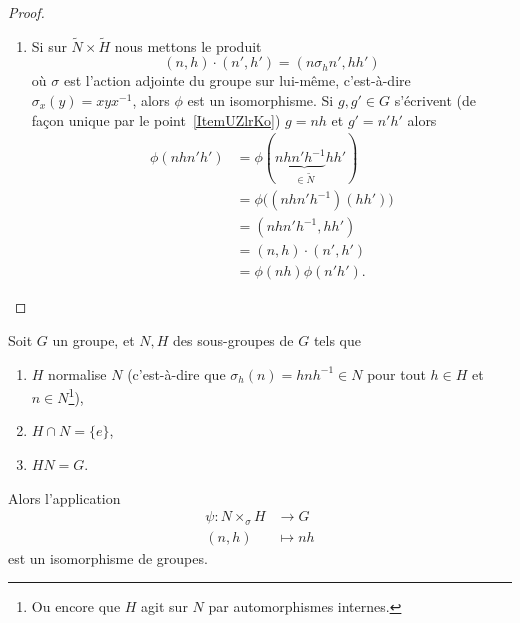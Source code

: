 \begin{proof}
\begin{enumerate}
		\item
		      Si sur \( \tilde N\times \tilde H\) nous mettons le produit
		      \begin{equation}
			      (n,h)\cdot(n',h')=(n\sigma_hn',hh')
		      \end{equation}
		      où \( \sigma\) est l'action adjointe du groupe sur lui-même, c'est-à-dire \( \sigma_x(y)=xyx^{-1}\), alors \( \phi\) est un isomorphisme. Si \( g,g'\in G\) s'écrivent (de façon unique par le point~\ref{ItemUZlrKo}) \( g=nh\) et \( g'=n'h'\) alors
		      \begin{subequations}
			      \begin{align}
				      \phi(nhn'h') & =\phi(n\underbrace{hn'h^{-1}}_{\in \tilde N}hh') \\
				                   & =\phi\big( (nhn'h^{-1})(hh') \big)               \\
				                   & =(nhn'h^{-1},hh')                                \\
				                   & =(n,h)\cdot(n',h')                               \\
				                   & =\phi(nh)\phi(n'h').
			      \end{align}
		      \end{subequations}
	\end{enumerate}
\end{proof}

\begin{corollary}\label{CoroGohOZ}
	Soit \( G\) un groupe, et \( N,H\) des sous-groupes de \( G\) tels que
	\begin{enumerate}
		\item
            \( H\) normalise \( N\) (c'est-à-dire que \( \sigma_h(n)= hnh^{-1}\in N\) pour tout \( h\in H\) et \( n\in N\)\footnote{Ou encore que \( H\) agit sur \( N\) par automorphismes internes.}),
		\item
		      \( H\cap N=\{ e \}\),
		\item
		      \( HN=G\).
	\end{enumerate}
	Alors l'application
	\begin{equation}
		\begin{aligned}
			\psi\colon N\times_{\sigma}H & \to G      \\
			(n,h)                        & \mapsto nh
		\end{aligned}
	\end{equation}
	est un isomorphisme de groupes.
\end{corollary}

